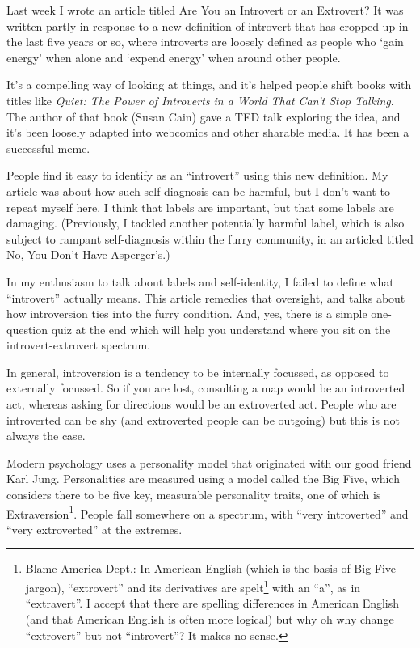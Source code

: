 
Last week I wrote an article titled Are You an Introvert or an Extrovert? It was written partly in response to a new definition of introvert that has cropped up in the last five years or so, where introverts are loosely defined as people who `gain energy' when alone and `expend energy' when around other people.

It's a compelling way of looking at things, and it's helped people shift books with titles like \textit{Quiet: The Power of Introverts in a World That Can't Stop Talking}. The author of that book (Susan Cain) gave a TED talk exploring the idea, and it's been loosely adapted into webcomics and other sharable media. It has been a successful meme.

People find it easy to identify as an ``introvert'' using this new definition. My article was about how such self-diagnosis can be harmful, but I don't want to repeat myself here. I think that labels are important, but that some labels are damaging. (Previously, I tackled another potentially harmful label, which is also subject to rampant self-diagnosis within the furry community, in an articled titled No, You Don't Have Asperger's.)

In my enthusiasm to talk about labels and self-identity, I failed to define what ``introvert'' actually means. This article remedies that oversight, and talks about how introversion ties into the furry condition. And, yes, there is a simple one-question quiz at the end which will help you understand where you sit on the introvert-extrovert spectrum.

In general, introversion is a tendency to be internally focussed, as opposed to externally focussed. So if you are lost, consulting a map would be an introverted act, whereas asking for directions would be an extroverted act. People who are introverted can be shy (and extroverted people can be outgoing) but this is not always the case.

Modern psychology uses a personality model that originated with our good friend Karl Jung. Personalities are measured using a model called the Big Five, which considers there to be five key, measurable personality traits, one of which is Extraversion\footnote{Blame America Dept.: In American English (which is the basis of Big Five jargon), ``extrovert'' and its derivatives are spelt\footnote{Note to Americans: this is what the rest of the English-speaking universe uses instead of your provincial neologism ``spelled''} with an ``a'', as in ``extravert''. I accept that there are spelling differences in American English (and that American English is often more logical) but why oh why change ``extrovert'' but not ``introvert''? It makes no sense.}. People fall somewhere on a spectrum, with ``very introverted'' and ``very extroverted'' at the extremes.

